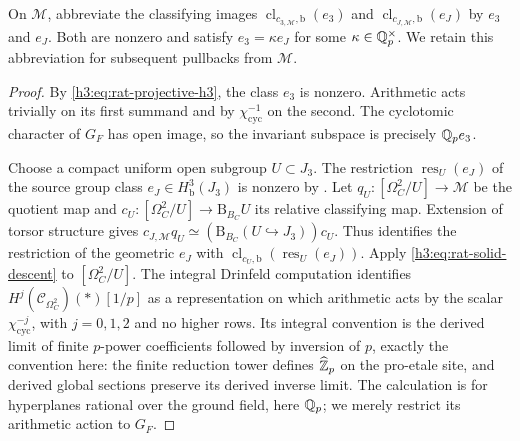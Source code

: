 \begin{lemma}\label{h3:rat:two-traces}
On $\mathcal M$, abbreviate the classifying images
$\operatorname{cl}_{c_{3,\mathcal M},\mathrm b}(e_3)$ and
$\operatorname{cl}_{c_{J,\mathcal M},\mathrm b}(e_J)$ by $e_3$ and
$e_J$.  Both are nonzero and satisfy $e_3=\kappa e_J$ for some
$\kappa\in\mathbb Q_p^\times$.  We retain this abbreviation for subsequent
pullbacks from $\mathcal M$.
\end{lemma}

\begin{proof}
By \eqref{h3:eq:rat-projective-h3}, the class $e_3$ is nonzero.
Arithmetic acts trivially on its first summand and by
$\chi_{\mathrm{cyc}}^{-1}$ on the second.  The cyclotomic
character of $G_F$ has open image, so the invariant subspace
is precisely $\mathbb Q_p e_3$.

Choose a compact uniform open subgroup $U\subset J_3$.  The
restriction $\operatorname{res}_U(e_J)$ of the source group class
$e_J\in H^3_{\mathrm b}(J_3)$ is nonzero by .
Let $q_U:[\Omega_C^2/U]\to\mathcal M$ be the quotient map and
$c_U:[\Omega_C^2/U]\to\mathrm B_{B_C}U$ its relative classifying map.
Extension of torsor structure gives
$c_{J,\mathcal M}q_U\simeq(\mathrm B_{B_C}(U\hookrightarrow J_3))c_U$.
Thus  identifies the restriction of
the geometric $e_J$ with
$\operatorname{cl}_{c_U,\mathrm b}(\operatorname{res}_U(e_J))$.
Apply \eqref{h3:eq:rat-solid-descent} to $[\Omega_C^2/U]$.
The integral Drinfeld computation
\cite[Theorems~1.1 and~5.1]{CDN} identifies
$H^j(\mathscr C_{\Omega_C^2})(*)[1/p]$ as a representation
on which arithmetic acts by the scalar
$\chi_{\mathrm{cyc}}^{-j}$, with $j=0,1,2$ and no higher
rows.  Its integral convention is the derived limit of finite
$p$-power coefficients followed by inversion of $p$, exactly
the convention here: the finite reduction tower defines
$\widehat{\mathbb Z}_p$ on the pro-etale site, and derived global
sections preserve its derived inverse limit.  The calculation is for hyperplanes
rational over the ground field, here $\mathbb Q_p$; we merely restrict
its arithmetic action to $G_F$.


\end{proof}
